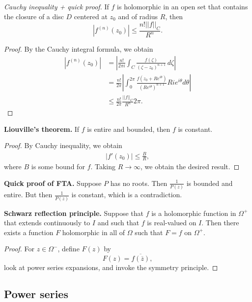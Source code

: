 \documentclass[12pt]{article}
\newcommand{\ol}{\overline}
\begin{document}
        {\it Cauchy inequality + quick proof.} If $f$ is holomorphic in an open set that contains the closure of a disc $D$ centered at $z_0$ and of radius $R$, then
        \[
          |f^{(n)}(z_0)| \leq \frac{n! ||f||_C}{R^n}.
        \]

        \begin{proof}
          By the Cauchy integral formula, we obtain
          \begin{align*}
            |f^{(n)}(z_0)| &= \left | \frac{n!}{2 \pi i} \int_{C} \frac{f(\zeta)}{(\zeta - z_0)^{n+1}} \, d \zeta \right | \\
            &= \frac{n!}{2 \pi} \left | \int_{0}^{2 \pi} \frac{f(z_0 + Re^{i \theta})}{(Re^{i \theta})^{n+1}} Ri e^{i \theta} d \theta \right | \\
            & \leq \frac{n!}{2 \pi} \frac{||f||_C}{R^n} 2\pi.
          \end{align*}
        \end{proof}

        {\bf Liouville's theorem.} If $f$ is entire and bounded, then $f$ is constant.

        \begin{proof}
          By Cauchy inequality, we obtain
          \begin{align*}
            |f'(z_0)| \leq \frac{B}{R},
          \end{align*}
          where $B$ is some bound for $f$.  Taking $R \to \infty$, we obtain the desired result.
        \end{proof}

        {\bf Quick proof of FTA.} Suppose $P$ has no roots.  Then $\frac{1}{P(z)}$ is bounded and entire.  But then $\frac{1}{P(z)}$ is constant, which is a contradiction.

        {\bf Schwarz reflection principle.} Suppose that $f$ is a holomorphic function in $\Omega^{+}$ that extends continuously to $I$ and such that $f$ is real-valued on $I$.  Then there exists a function $F$ holomorphic in all of $\Omega$ such that $F = f$ on $\Omega^{+}$.

        \begin{proof}
          For $z \in \Omega^{-}$, define $F(z)$ by
          \[
            F(z) = \ol{f(\ol{z})},
          \]
          look at power series expansions, and invoke the symmetry principle.
        \end{proof}

        \subsection{Power series}
\end{document}

